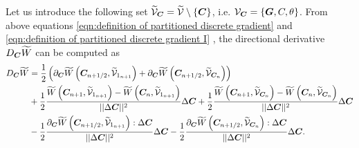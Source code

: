 Let us introduce the following set $\widetilde{\mathcal{V}}_{\boldsymbol{C}}=\widetilde{\mathcal{V}}\setminus\{\boldsymbol{C}\}$, i.e. ${\mathcal{V}_{\boldsymbol{C}}}=\{\boldsymbol{G},C,\theta\}$. From above equations \eqref{eqn:definition of partitioned discrete gradient} and \eqref{eqn:definition of partitioned discrete gradient I} , 
the directional derivative $D_{\boldsymbol{C}}\widetilde{W}$ can be computed as
%
\begin{equation}\label{eqn:DC}
\begin{aligned}
D_{\vect{C}}\widetilde{W}& =  \frac{1}{2}\left(\partial_{\vect{C}}\widetilde{W}\left(\vect{C}_{n+1/2},\widetilde{\mathcal{V}}_{1_{n+1}}\right) + 
\partial_{\vect{C}}\widetilde{W}\left(\vect{C}_{n+1/2},\widetilde{\mathcal{V}}_{\vect{C}_{n}}\right)\right)\\
%
&+\frac{1}{2}\frac{\widetilde{W}\left(\vect{C}_{n+1},\widetilde{\mathcal{V}}_{1_{n+1}}\right) - \widetilde{W}\left(\vect{C}_{n},\widetilde{\mathcal{V}}_{1_{n+1}}\right)}{\vert\vert\Delta\vect{C}\vert\vert^2}\Delta\vect{C}
%
+\frac{1}{2}\frac{\widetilde{W}\left(\vect{C}_{n+1},\widetilde{\mathcal{V}}_{\vect{C}_{n}}\right) - \widetilde{W}\left(\vect{C}_{n},\widetilde{\mathcal{V}}_{\vect{C}_{n}}\right)}{\vert\vert\Delta\vect{C}\vert\vert^2}\Delta\vect{C}\\
%
&-\frac{1}{2}\frac{\partial_{\vect{C}}\widetilde{W}\left(\vect{C}_{n+1/2},\widetilde{\mathcal{V}}_{1_{n+1}}\right):\Delta\vect{C}}{\vert\vert\Delta\vect{C}\vert\vert^2}\Delta\vect{C} - \frac{1}{2}\frac{\partial_{\vect{C}}\widetilde{W}\left(\vect{C}_{n+1/2},\widetilde{\mathcal{V}}_{\vect{C}_{n}}\right):\Delta\vect{C}}{\vert\vert\Delta\vect{C}\vert\vert^2}\Delta\vect{C}.
%
%
\end{aligned}
\end{equation}

